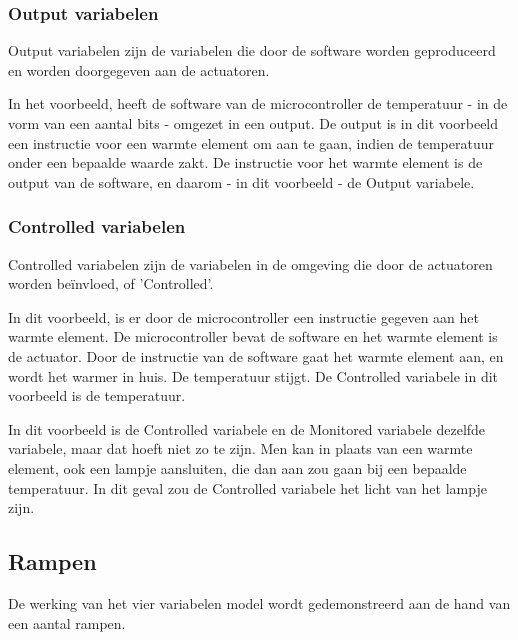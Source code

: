\documentclass{article}
\begin{document}
			\subsubsection{Output variabelen}
			
			Output variabelen zijn de variabelen die door de software worden geproduceerd en worden doorgegeven aan de actuatoren.

			In het voorbeeld, heeft de software van de microcontroller de temperatuur - in de vorm van een aantal bits - omgezet in een output. De output is in dit voorbeeld een instructie voor een warmte element om aan te gaan, indien de temperatuur onder een bepaalde waarde zakt. De instructie voor het warmte element is de output van de software, en daarom - in dit voorbeeld - de Output variabele.

			\subsubsection{Controlled variabelen}

			Controlled variabelen zijn de variabelen in de omgeving die door de actuatoren worden beïnvloed, of 'Controlled'.

			In dit voorbeeld, is er door de microcontroller een instructie gegeven aan het warmte element. De microcontroller bevat de software en het warmte element is de actuator. Door de instructie van de software gaat het warmte element aan, en wordt het warmer in huis. De temperatuur stijgt. De Controlled variabele in dit voorbeeld is de temperatuur.

			
			In dit voorbeeld is de Controlled variabele en de Monitored variabele dezelfde variabele, maar dat hoeft niet zo te zijn. Men kan in plaats van een warmte element, ook een lampje aansluiten, die dan aan zou gaan bij een bepaalde temperatuur. In dit geval zou de Controlled variabele het licht van het lampje zijn.
		
		\subsection{Rampen}
		
		De werking van het vier variabelen model wordt gedemonstreerd aan de hand van een aantal rampen.
		
\end{document}
